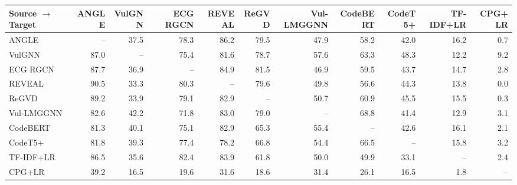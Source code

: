 \begin{tabular}{lrrrrrrrrrr}
\toprule
Source $\rightarrow$ Target & ANGLE & VulGNN & ECG RGCN & REVEAL & ReGVD & Vul-LMGGNN & CodeBERT & CodeT5+ & TF-IDF+LR & CPG+LR \\
\midrule
ANGLE & -- & 37.5 & 78.3 & 86.2 & 79.5 & 47.9 & 58.2 & 42.0 & 16.2 & 0.7 \\
VulGNN & 87.0 & -- & 75.4 & 81.6 & 78.7 & 57.6 & 63.3 & 48.3 & 12.2 & 9.2 \\
ECG RGCN & 87.7 & 36.9 & -- & 84.9 & 81.5 & 46.9 & 59.5 & 43.7 & 14.7 & 2.8 \\
REVEAL & 90.5 & 33.3 & 80.3 & -- & 79.6 & 49.8 & 56.6 & 44.3 & 13.8 & 0.0 \\
ReGVD & 89.2 & 33.9 & 79.1 & 82.9 & -- & 50.7 & 60.9 & 45.5 & 15.5 & 0.3 \\
Vul-LMGGNN & 82.6 & 42.2 & 71.8 & 83.0 & 79.0 & -- & 68.8 & 41.4 & 12.9 & 3.1 \\
CodeBERT & 81.3 & 40.1 & 75.1 & 82.9 & 65.3 & 55.4 & -- & 42.6 & 16.1 & 2.1 \\
CodeT5+ & 81.8 & 39.3 & 77.4 & 78.2 & 66.8 & 54.4 & 66.5 & -- & 15.8 & 3.2 \\
TF-IDF+LR & 86.5 & 35.6 & 82.4 & 83.9 & 61.8 & 50.0 & 49.9 & 33.1 & -- & 2.4 \\
CPG+LR & 39.2 & 16.5 & 19.6 & 31.6 & 18.6 & 31.4 & 26.1 & 16.5 & 1.8 & -- \\
\bottomrule
\end{tabular}
